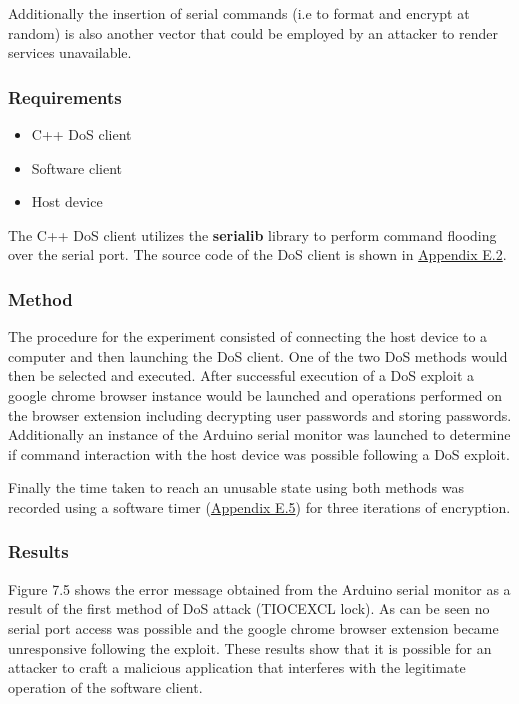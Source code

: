 Additionally the insertion of serial commands (i.e to format and encrypt at random) is also another vector that could be employed by an attacker to render services unavailable.

\subsubsection{Requirements}

\begin{itemize}
  \item C++ DoS client
  \item Software client
  \item Host device
\end{itemize}

The C++ DoS client utilizes the \textbf{serialib} library to perform command flooding over the serial port. The source code of the DoS client is shown in \hyperref[sec:exp2]{Appendix E.2}.

\subsubsection{Method}
The procedure for the experiment consisted of connecting the host device to a computer and then launching the DoS client. One of the two DoS methods would then be selected and executed. After successful execution of a DoS exploit a google chrome browser instance would be launched and operations performed on the browser extension including decrypting user passwords and storing passwords. Additionally an instance of the Arduino serial monitor was launched to determine if command interaction with the host device was possible following a DoS exploit.

Finally the time taken to reach an unusable state using both methods was recorded using a software timer (\hyperref[sec:timerc]{Appendix E.5}) for three iterations of encryption.

\subsubsection{Results}

Figure 7.5 shows the error message obtained from the Arduino serial monitor as a result of the first method of DoS attack (TIOCEXCL lock). As can be seen no serial port access was possible and the google chrome browser extension became unresponsive following the exploit. These results show that it is possible for an attacker to craft a malicious application that interferes with the legitimate operation of the software client.

